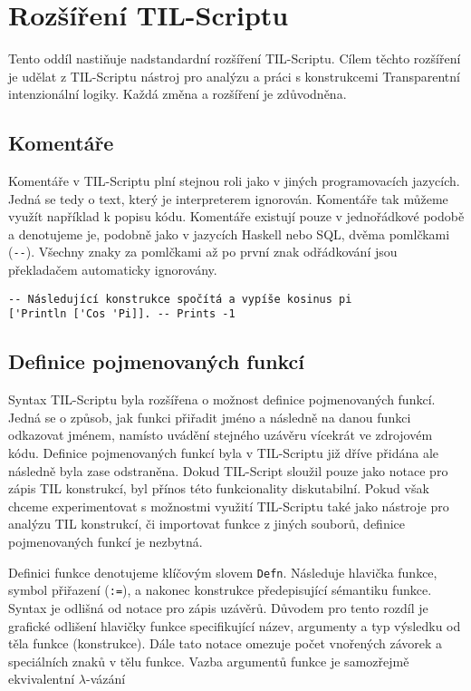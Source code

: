 \section{Rozšíření TIL-Scriptu}

Tento oddíl nastiňuje nadstandardní rozšíření TIL-Scriptu. Cílem těchto rozšíření je udělat
z TIL-Scriptu nástroj pro analýzu a práci s konstrukcemi Transparentní intenzionální logiky. Každá
změna a rozšíření je zdůvodněna.

\subsection{Komentáře}

Komentáře v TIL-Scriptu plní stejnou roli jako v jiných programovacích jazycích. Jedná se tedy
o text, který je interpreterem ignorován. Komentáře tak můžeme využít například k popisu kódu.
Komentáře existují pouze v jednořádkové podobě a denotujeme je, podobně jako v jazycích Haskell
nebo SQL, dvěma pomlčkami (\lstinline{--}). Všechny znaky za pomlčkami až po první znak odřádkování
jsou překladačem automaticky ignorovány.

\begin{lstlisting}[caption={Příklad využití komentářů}]
-- Následující konstrukce spočítá a vypíše kosinus pi
['Println ['Cos 'Pi]]. -- Prints -1
\end{lstlisting}

\subsection{Definice pojmenovaných funkcí} \label{fn-definition}

Syntax TIL-Scriptu byla rozšířena o možnost definice pojmenovaných funkcí. Jedná se o způsob, jak
funkci přiřadit jméno a následně na danou funkci odkazovat jménem, namísto uvádění stejného uzávěru
vícekrát ve zdrojovém kódu. Definice pojmenovaných funkcí byla v TIL-Scriptu již dříve přidána
ale následně byla zase odstraněna. Dokud TIL-Script sloužil pouze jako notace pro zápis TIL
konstrukcí, byl přínos této funkcionality diskutabilní. Pokud však chceme experimentovat
s možnostmi využití TIL-Scriptu také jako nástroje pro analýzu TIL konstrukcí, či importovat
funkce z jiných souborů, definice pojmenovaných funkcí je nezbytná.

Definici funkce denotujeme klíčovým slovem \lstinline{Defn}. Následuje hlavička funkce, symbol
přiřazení (\lstinline{:=}), a nakonec konstrukce předepisující sémantiku funkce. Syntax je odlišná
od notace pro zápis uzávěrů. Důvodem pro tento rozdíl je grafické odlišení hlavičky funkce
specifikující název, argumenty a typ výsledku od těla funkce (konstrukce). Dále tato notace
omezuje počet vnořených závorek a speciálních znaků v tělu funkce. Vazba argumentů funkce je
samozřejmě ekvivalentní $\lambda$-vázání

